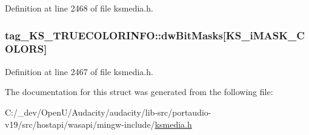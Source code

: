 Definition at line 2468 of file ksmedia.\+h.

\subsubsection[{\texorpdfstring{dw\+Bit\+Masks}{dwBitMasks}}]{ tag\+\_\+\+K\+S\+\_\+\+T\+R\+U\+E\+C\+O\+L\+O\+R\+I\+N\+F\+O\+::dw\+Bit\+Masks\mbox{[}{\bf K\+S\+\_\+i\+M\+A\+S\+K\+\_\+\+C\+O\+L\+O\+RS}\mbox{]}}\hypertarget{structtag___k_s___t_r_u_e_c_o_l_o_r_i_n_f_o_a0b0414de5c030f6350a8280675a44d8c}{}\label{structtag___k_s___t_r_u_e_c_o_l_o_r_i_n_f_o_a0b0414de5c030f6350a8280675a44d8c}


Definition at line 2467 of file ksmedia.\+h.



The documentation for this struct was generated from the following file\+:\begin{DoxyCompactItemize}
\item 
C\+:/\+\_\+dev/\+Open\+U/\+Audacity/audacity/lib-\/src/portaudio-\/v19/src/hostapi/wasapi/mingw-\/include/\hyperlink{ksmedia_8h}{ksmedia.\+h}\end{DoxyCompactItemize}
